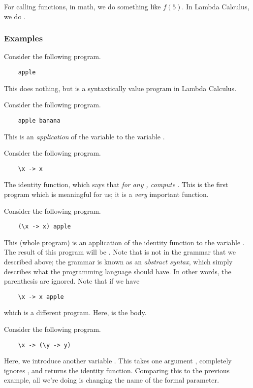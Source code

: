 \documentclass[letterpaper]{article}
\begin{document}
\bigskip 

For calling functions, in math, we do something like $f(5)$. In Lambda Calculus, we do . 


\subsubsection{Examples}
Consider the following program. 
\begin{verbatim}
    apple
\end{verbatim}
This does nothing, but is a syntaxtically value program in Lambda Calculus.

\bigskip 

Consider the following program. 
\begin{verbatim}
    apple banana
\end{verbatim}
This is an \emph{application} of the variable  to the variable .

\bigskip 

Consider the following program.
\begin{verbatim}
    \x -> x
\end{verbatim}
The identity function, which says that \emph{for any , compute }. This is the first program which is meaningful for us; it is a \emph{very} important function. 

\bigskip 

Consider the following program.
\begin{verbatim}
    (\x -> x) apple
\end{verbatim}
This (whole program) is an application of the identity function to the variable . The result of this program will be . Note that \code{()} is not in the grammar that we described above; the grammar is known as an \emph{abstract syntax}, which simply describes what the programming language should have. In other words, the parenthesis are ignored. Note that if we have 
\begin{verbatim}
    \x -> x apple 
\end{verbatim}
which is a different program. Here,  is the body. 

\bigskip 

Consider the following program.
\begin{verbatim}
    \x -> (\y -> y)
\end{verbatim}
Here, we introduce another variable . This takes one argument , completely ignores , and returns the identity function. Comparing this to the previous example, all we're doing is changing the name of the formal parameter. 
\end{document}
